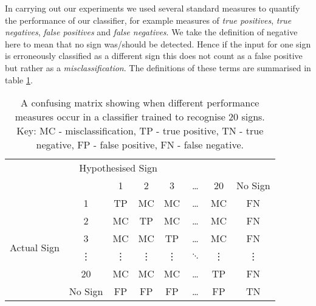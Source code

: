 In carrying out our experiments we used several standard measures to quantify the performance of our classifier, for example measures of \emph{true positives}, \emph{true negatives}, \emph{false positives} and \emph{false negatives}. We take the definition of negative here to mean that no sign was/should be detected. Hence if the input for one sign is erroneously classified as a different sign this does not count as a false positive but rather as a \emph{misclassification}. The definitions of these terms are summarised in table \ref{tab:errors}.
\begin{table}[h!]
  \centering
  \begin{tabular}{c c|c c c c c c}         
\multicolumn{7}{c}{Hypothesised Sign} \\   
    			& & 1 & 2 & 3 & \dots & 20 & No Sign \\
  \hline
\multirow{6}{*}{\begin{sideways} Actual Sign \end{sideways}} &  1 & TP & MC & MC & \dots& MC&FN \\
  &2 		 	& MC & TP & MC & \dots& MC&FN \\
  &3 			& MC & MC & TP & \dots& MC&FN \\
  &\vdots 	& \vdots & \vdots & \vdots& $\ddots$ & \vdots & \vdots \\
  &20 		& MC & MC & MC &  \dots & TP & FN \\
  &No Sign 	& FP & FP & FP & \dots & FP & TN \\

  \end{tabular}
  \caption{A confusing matrix showing when different performance measures occur in a classifier trained to recognise 20 signs. Key: MC - misclassification, TP - true positive, TN - true negative, FP - false positive, FN - false negative. }
  \label{tab:errors}
\end{table}

